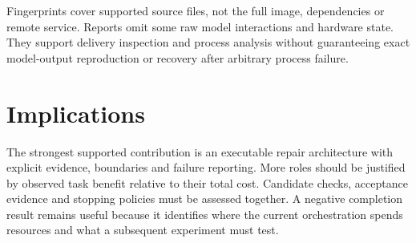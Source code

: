 Fingerprints cover supported source files, not the full image, dependencies or remote service. Reports omit some raw model interactions and hardware state. They support delivery inspection and process analysis without guaranteeing exact model-output reproduction or recovery after arbitrary process failure.

\section{Implications}\label{sec:7.5}

The strongest supported contribution is an executable repair architecture with explicit evidence, boundaries and failure reporting. More roles should be justified by observed task benefit relative to their total cost. Candidate checks, acceptance evidence and stopping policies must be assessed together. A negative completion result remains useful because it identifies where the current orchestration spends resources and what a subsequent experiment must test.
